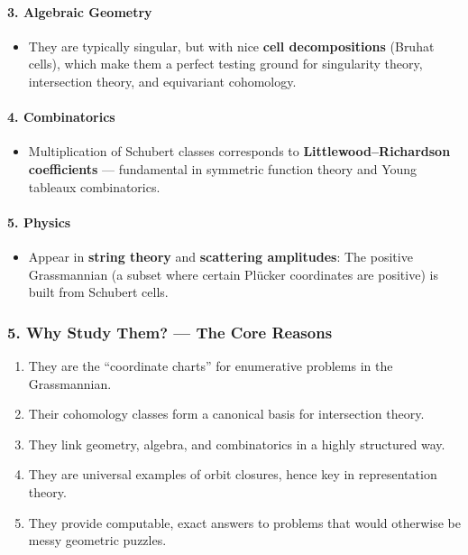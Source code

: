 \documentclass{amsart}
\theoremstyle{plain}
\theoremstyle{definition}
\theoremstyle{remark}
\begin{document}
\paragraph{3. \textbf{Algebraic Geometry}}

\begin{itemize}
	\item They are typically singular, but with nice \textbf{cell decompositions} (Bruhat cells), which make them a perfect testing ground for singularity theory, intersection theory, and equivariant cohomology.
\end{itemize}

\paragraph{4. \textbf{Combinatorics}}

\begin{itemize}
	\item Multiplication of Schubert classes corresponds to \textbf{Littlewood–Richardson coefficients} — fundamental in symmetric function theory and Young tableaux combinatorics.
\end{itemize}

\paragraph{5. \textbf{Physics}}

\begin{itemize}
	\item Appear in \textbf{string theory} and \textbf{scattering amplitudes}: The positive Grassmannian (a subset where certain Plücker coordinates are positive) is built from Schubert cells.
\end{itemize}

\subsubsection{5. \textbf{Why Study Them? — The Core Reasons}}

\begin{enumerate}
	\item They are the “coordinate charts” for enumerative problems in the Grassmannian.
	\item Their cohomology classes form a canonical basis for intersection theory.
	\item They link geometry, algebra, and combinatorics in a highly structured way.
	\item They are universal examples of orbit closures, hence key in representation theory.
	\item They provide computable, exact answers to problems that would otherwise be messy geometric puzzles.
\end{enumerate}
\end{document}
